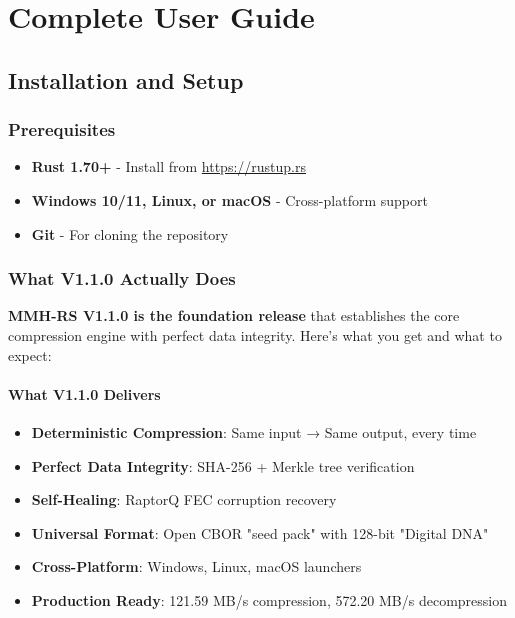 \documentclass[11pt,a4paper]{article}
\begin{document}
	\tableofcontents
	\newpage

	\section{Complete User Guide}
	\label{sec:userguide}

	\subsection{Installation and Setup}

	\subsubsection{Prerequisites}
	\begin{itemize}
		\item \textbf{Rust 1.70+} - Install from \url{https://rustup.rs}
		\item \textbf{Windows 10/11, Linux, or macOS} - Cross-platform support
		\item \textbf{Git} - For cloning the repository
	\end{itemize}

	\subsubsection{What V1.1.0 Actually Does}
	
	\textbf{MMH-RS V1.1.0 is the foundation release} that establishes the core compression engine with perfect data integrity. Here's what you get and what to expect:
	
	\paragraph{What V1.1.0 Delivers}
	\begin{itemize}
		\item \textbf{Deterministic Compression}: Same input → Same output, every time
		\item \textbf{Perfect Data Integrity}: SHA-256 + Merkle tree verification
		\item \textbf{Self-Healing}: RaptorQ FEC corruption recovery
		\item \textbf{Universal Format}: Open CBOR "seed pack" with 128-bit "Digital DNA"
		\item \textbf{Cross-Platform}: Windows, Linux, macOS launchers
		\item \textbf{Production Ready}: 121.59 MB/s compression, 572.20 MB/s decompression
	\end{itemize}
	
\end{document}
